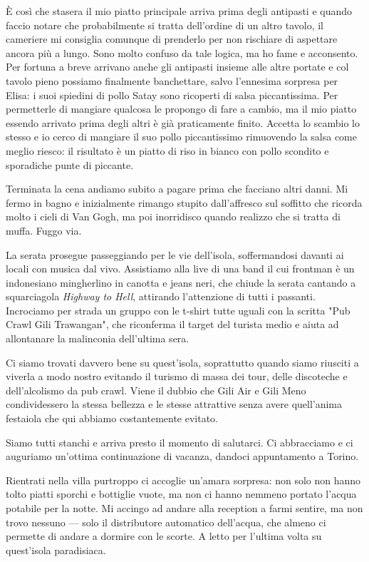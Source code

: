 È così che stasera il mio piatto principale arriva prima degli antipasti e quando faccio notare che probabilmente si tratta dell'ordine di un altro tavolo, il cameriere mi consiglia comunque di prenderlo per non rischiare di aspettare ancora più a lungo. Sono molto confuso da tale logica, ma ho fame e acconsento. Per fortuna a breve arrivano anche gli antipasti insieme alle altre portate e col tavolo pieno possiamo finalmente banchettare, salvo l'ennesima sorpresa per Elisa: i suoi spiedini di pollo Satay sono ricoperti di salsa piccantissima. Per permetterle di mangiare qualcosa le propongo di fare a cambio, ma il mio piatto essendo arrivato prima degli altri è già praticamente finito. Accetta lo scambio lo stesso e io cerco di mangiare il suo pollo piccantissimo rimuovendo la salsa come meglio riesco: il risultato è un piatto di riso in bianco con pollo scondito e sporadiche punte di piccante.

Terminata la cena andiamo subito a pagare prima che facciano altri danni. Mi fermo in bagno e inizialmente rimango stupito dall'affresco sul soffitto che ricorda molto i cieli di Van Gogh, ma poi inorridisco quando realizzo che si tratta di muffa. Fuggo via.

La serata prosegue passeggiando per le vie dell'isola, soffermandosi davanti ai locali con musica dal vivo. Assistiamo alla live di una band il cui frontman è un indonesiano mingherlino in canotta e jeans neri, che chiude la serata cantando a squarciagola \textit{Highway to Hell}, attirando l'attenzione di tutti i passanti. Incrociamo per strada un gruppo con le t-shirt tutte uguali con la scritta "Pub Crawl Gili Trawangan", che riconferma il target del turista medio e aiuta ad allontanare la malinconia dell'ultima sera.

Ci siamo trovati davvero bene su quest'isola, soprattutto quando siamo riusciti a viverla a modo nostro evitando il turismo di massa dei tour, delle discoteche e dell'alcolismo da pub crawl. Viene il dubbio che Gili Air e Gili Meno condividessero la stessa bellezza e le stesse attrattive senza avere quell'anima festaiola che qui abbiamo costantemente evitato.

Siamo tutti stanchi e arriva presto il momento di salutarci. Ci abbracciamo e ci auguriamo un'ottima continuazione di vacanza, dandoci appuntamento a Torino.

Rientrati nella villa purtroppo ci accoglie un'amara sorpresa: non solo non hanno tolto piatti sporchi e bottiglie vuote, ma non ci hanno nemmeno portato l'acqua potabile per la notte. Mi accingo ad andare alla reception a farmi sentire, ma non trovo nessuno — solo il distributore automatico dell'acqua, che almeno ci permette di andare a dormire con le scorte. A letto per l'ultima volta su quest'isola paradisiaca.


